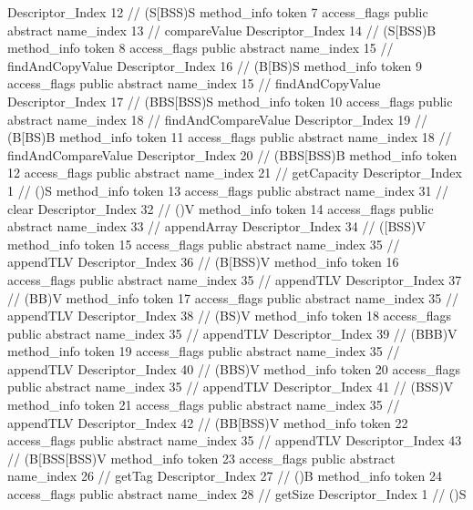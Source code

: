 {{{{{					Descriptor_Index	12		// (S[BSS)S
				}
				method_info {
					token	7
					access_flags	public abstract
					name_index	13		// compareValue
					Descriptor_Index	14		// (S[BSS)B
				}
				method_info {
					token	8
					access_flags	public abstract
					name_index	15		// findAndCopyValue
					Descriptor_Index	16		// (B[BS)S
				}
				method_info {
					token	9
					access_flags	public abstract
					name_index	15		// findAndCopyValue
					Descriptor_Index	17		// (BBS[BSS)S
				}
				method_info {
					token	10
					access_flags	public abstract
					name_index	18		// findAndCompareValue
					Descriptor_Index	19		// (B[BS)B
				}
				method_info {
					token	11
					access_flags	public abstract
					name_index	18		// findAndCompareValue
					Descriptor_Index	20		// (BBS[BSS)B
				}
				method_info {
					token	12
					access_flags	public abstract
					name_index	21		// getCapacity
					Descriptor_Index	1		// ()S
				}
				method_info {
					token	13
					access_flags	public abstract
					name_index	31		// clear
					Descriptor_Index	32		// ()V
				}
				method_info {
					token	14
					access_flags	public abstract
					name_index	33		// appendArray
					Descriptor_Index	34		// ([BSS)V
				}
				method_info {
					token	15
					access_flags	public abstract
					name_index	35		// appendTLV
					Descriptor_Index	36		// (B[BSS)V
				}
				method_info {
					token	16
					access_flags	public abstract
					name_index	35		// appendTLV
					Descriptor_Index	37		// (BB)V
				}
				method_info {
					token	17
					access_flags	public abstract
					name_index	35		// appendTLV
					Descriptor_Index	38		// (BS)V
				}
				method_info {
					token	18
					access_flags	public abstract
					name_index	35		// appendTLV
					Descriptor_Index	39		// (BBB)V
				}
				method_info {
					token	19
					access_flags	public abstract
					name_index	35		// appendTLV
					Descriptor_Index	40		// (BBS)V
				}
				method_info {
					token	20
					access_flags	public abstract
					name_index	35		// appendTLV
					Descriptor_Index	41		// (BSS)V
				}
				method_info {
					token	21
					access_flags	public abstract
					name_index	35		// appendTLV
					Descriptor_Index	42		// (BB[BSS)V
				}
				method_info {
					token	22
					access_flags	public abstract
					name_index	35		// appendTLV
					Descriptor_Index	43		// (B[BSS[BSS)V
				}
				method_info {
					token	23
					access_flags	public abstract
					name_index	26		// getTag
					Descriptor_Index	27		// ()B
				}
				method_info {
					token	24
					access_flags	public abstract
					name_index	28		// getSize
					Descriptor_Index	1		// ()S
}}}}}
